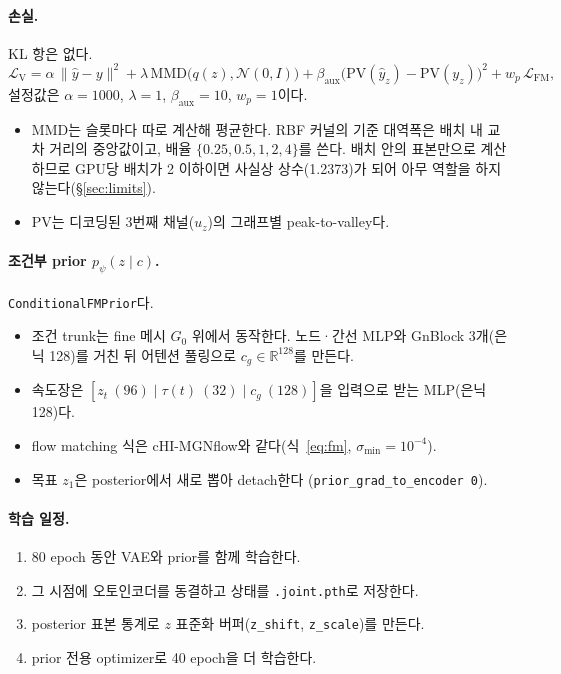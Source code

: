 \documentclass[11pt]{article}
\newcommand{\N}{\mathcal{N}}
\newcommand{\R}{\mathbb{R}}
\newcommand{\code}[1]{\texttt{#1}}
\begin{document}
\paragraph{손실.} KL 항은 없다.
\begin{equation}
  \mathcal{L}_{\text{V}} = \alpha\,\|\hat y - y\|^2
  + \lambda\,\mathrm{MMD}\bigl(q(z),\N(0,I)\bigr)
  + \beta_{\text{aux}}\bigl(\mathrm{PV}(\hat y_{z}) - \mathrm{PV}(y_{z})\bigr)^2
  + w_p\,\mathcal{L}_{\text{FM}},
\end{equation}
설정값은 $\alpha=1000$, $\lambda=1$, $\beta_{\text{aux}}=10$, $w_p=1$이다.
\begin{itemize}
\item MMD는 슬롯마다 따로 계산해 평균한다. RBF 커널의 기준 대역폭은 배치 내
  교차 거리의 중앙값이고, 배율 $\{0.25,0.5,1,2,4\}$를 쓴다. 배치 안의
  표본만으로 계산하므로 GPU당 배치가 2 이하이면 사실상 상수(1.2373)가 되어
  아무 역할을 하지 않는다(\S\ref{sec:limits}).
\item PV는 디코딩된 3번째 채널($u_z$)의 그래프별 peak-to-valley다.
\end{itemize}

\paragraph{조건부 prior $p_\psi(z\mid c)$.} \code{ConditionalFMPrior}다.
\begin{itemize}
\item 조건 trunk는 fine 메시 $G_0$ 위에서 동작한다. 노드·간선 MLP와 GnBlock
  3개(은닉 128)를 거친 뒤 어텐션 풀링으로 $c_g\in\R^{128}$를 만든다.
\item 속도장은 $[z_t\ (96) \mid \tau(t)\ (32) \mid c_g\ (128)]$을 입력으로
  받는 MLP(은닉 128)다.
\item flow matching 식은 cHI-MGNflow와 같다(식~\ref{eq:fm}, $\sigma_{\min}=10^{-4}$).
\item 목표 $z_1$은 posterior에서 새로 뽑아 detach한다
  (\code{prior\_grad\_to\_encoder 0}).
\end{itemize}

\paragraph{학습 일정.}
\begin{enumerate}
\item 80 epoch 동안 VAE와 prior를 함께 학습한다.
\item 그 시점에 오토인코더를 동결하고 상태를 \code{.joint.pth}로 저장한다.
\item posterior 표본 통계로 $z$ 표준화 버퍼(\code{z\_shift}, \code{z\_scale})를
  만든다.
\item prior 전용 optimizer로 40 epoch을 더 학습한다.
\end{enumerate}
\end{document}
